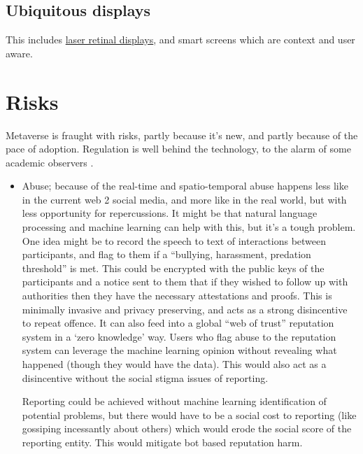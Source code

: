 \subsection{Ubiquitous displays}
This includes \href{https://skarredghost.com/2022/06/28/mojo-vision-contact-tested-eye/}{laser retinal displays}, and smart screens which are context and user aware.
\section{Risks}
Metaverse is fraught with risks, partly because it's new, and partly because of the pace of adoption. Regulation is well behind the technology, to the alarm of some academic observers \cite{rosenberg2022regulation}.
\begin{itemize}
\item Abuse; because of the real-time and spatio-temporal abuse happens less like in the current web 2 social media, and more like in the real world, but with less opportunity for repercussions. It might be that natural language processing and machine learning can help with this, but it's a tough problem. One idea might be to record the speech to text of interactions between participants, and flag to them if a ``bullying, harassment, predation threshold'' is met. This could be encrypted with the public keys of the participants and a notice sent to them that if they wished to follow up with authorities then they have the necessary attestations and proofs. This is minimally invasive and privacy preserving, and acts as a strong disincentive to repeat offence. It can also feed into a global ``web of trust'' reputation system in a `zero knowledge' way. Users who flag abuse to the reputation system can leverage the machine learning opinion without revealing what happened (though they would have the data). This would also act as a disincentive without the social stigma issues of reporting.\par
Reporting could be achieved without machine learning identification of potential problems, but there would have to be a social cost to reporting (like gossiping incessantly about others) which would erode the social score of the reporting entity. This would mitigate bot based reputation harm.

\end{itemize}
